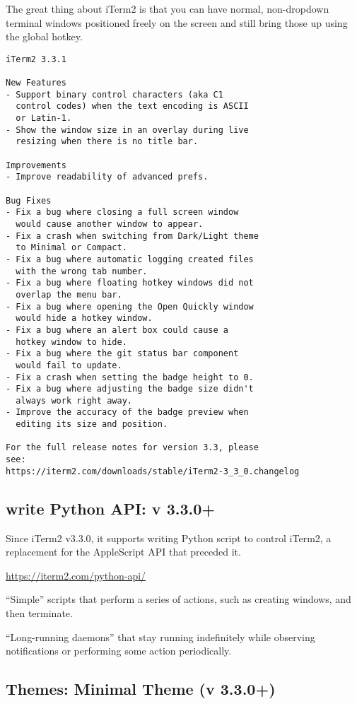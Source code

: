 The great thing about iTerm2 is that you can have normal, non-dropdown terminal
windows positioned freely on the screen and still bring those up using the
global hotkey.

\begin{verbatim}
iTerm2 3.3.1

New Features
- Support binary control characters (aka C1
  control codes) when the text encoding is ASCII
  or Latin-1.
- Show the window size in an overlay during live
  resizing when there is no title bar.

Improvements
- Improve readability of advanced prefs.

Bug Fixes
- Fix a bug where closing a full screen window
  would cause another window to appear.
- Fix a crash when switching from Dark/Light theme
  to Minimal or Compact.
- Fix a bug where automatic logging created files
  with the wrong tab number.
- Fix a bug where floating hotkey windows did not
  overlap the menu bar.
- Fix a bug where opening the Open Quickly window
  would hide a hotkey window.
- Fix a bug where an alert box could cause a
  hotkey window to hide.
- Fix a bug where the git status bar component
  would fail to update.
- Fix a crash when setting the badge height to 0.
- Fix a bug where adjusting the badge size didn't
  always work right away.
- Improve the accuracy of the badge preview when
  editing its size and position.

For the full release notes for version 3.3, please
see:
https://iterm2.com/downloads/stable/iTerm2-3_3_0.changelog
\end{verbatim}


\subsection{write Python API: v 3.3.0+}

Since iTerm2 v3.3.0, it supports writing Python script to control iTerm2,
a replacement for the AppleScript API that preceded it.

\url{https://iterm2.com/python-api/}

“Simple” scripts that perform a series of actions, such as creating windows, and
then terminate.

“Long-running daemons” that stay running indefinitely while observing
notifications or performing some action periodically.

\subsection{Themes: Minimal Theme (v 3.3.0+)}

